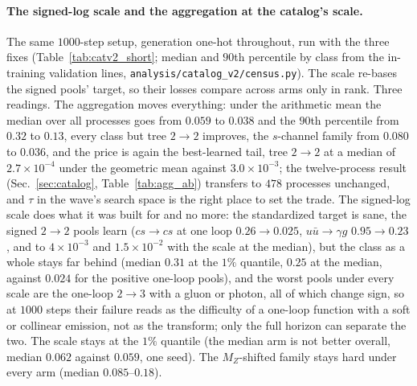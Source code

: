 \documentclass[11pt]{article}
\newcommand{\code}[1]{\texttt{#1}}
\begin{document}
\paragraph{The signed-log scale and the aggregation at the catalog's scale.} The same
$1000$-step setup, generation one-hot throughout, run with the three fixes
(Table~\ref{tab:catv2_short}; median and $90$th percentile by class from the in-training
validation lines, \code{analysis/catalog\_v2/census.py}). The scale re-bases the signed pools'
target, so their losses compare across arms only in rank. Three readings. The aggregation
moves everything: under the arithmetic mean the median over all processes goes from $0.059$
to $0.038$ and the $90$th percentile from $0.32$ to $0.13$, every class but tree $2\to2$
improves, the $s$-channel family from $0.080$ to $0.036$, and the price is again the
best-learned tail, tree $2\to2$ at a median of $2.7\times10^{-4}$ under the geometric mean
against $3.0\times10^{-3}$; the twelve-process result (Sec.~\ref{sec:catalog},
Table~\ref{tab:agg_ab}) transfers to $478$ processes unchanged, and $\tau$ in the wave's
search space is the right place to set the trade. The signed-log scale does what it was
built for and no more: the standardized target is sane, the signed $2\to2$ pools learn
($cs\to cs$ at one loop $0.26\to0.025$, $u\bar u\to\gamma g$ $0.95\to0.23$, and to
$4\times10^{-3}$ and $1.5\times10^{-2}$ with the scale at the median), but the class as a whole stays far behind (median $0.31$ at the $1\%$ quantile, $0.25$ at the
median, against $0.024$ for the positive one-loop pools), and the worst pools under every scale
are the
one-loop $2\to3$ with a gluon or photon, all of which change sign, so at $1000$ steps their
failure reads as the difficulty of a one-loop function with a soft or collinear emission,
not as the transform; only the full horizon can separate the two. The scale stays at the
$1\%$ quantile (the median arm is not better overall, median $0.062$ against $0.059$, one seed). The
$M_Z$-shifted family stays hard under every arm (median $0.085$--$0.18$).
\end{document}
